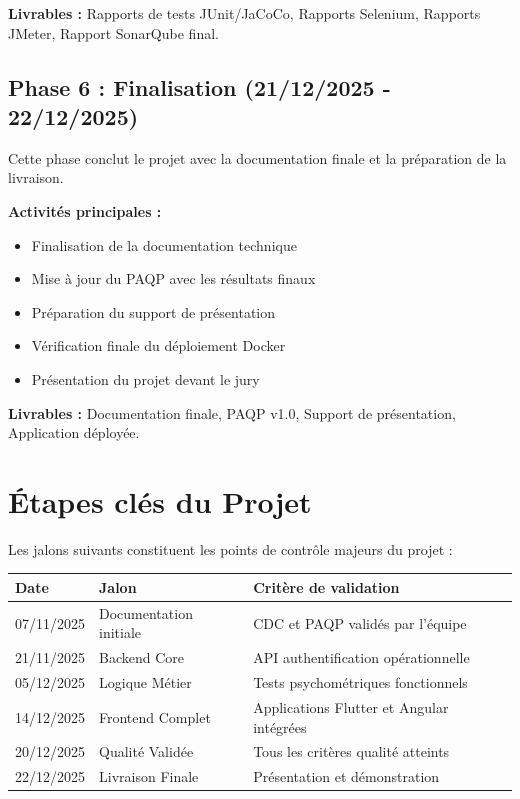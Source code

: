 \documentclass[12pt,a4paper]{report}
\begin{document}
\textbf{Livrables :} Rapports de tests JUnit/JaCoCo, Rapports Selenium, Rapports JMeter, Rapport SonarQube final.

\subsection{Phase 6 : Finalisation (21/12/2025 - 22/12/2025)}

Cette phase conclut le projet avec la documentation finale et la préparation de la livraison.

\textbf{Activités principales :}
\begin{itemize}
    \item Finalisation de la documentation technique
    \item Mise à jour du PAQP avec les résultats finaux
    \item Préparation du support de présentation
    \item Vérification finale du déploiement Docker
    \item Présentation du projet devant le jury
\end{itemize}

\textbf{Livrables :} Documentation finale, PAQP v1.0, Support de présentation, Application déployée.

\section{Étapes clés du Projet}

Les jalons suivants constituent les points de contrôle majeurs du projet :

\begin{center}
\begin{tabular}{|l|l|l|}
    \hline
    \textbf{Date} & \textbf{Jalon} & \textbf{Critère de validation} \\
    \hline
    07/11/2025 & Documentation initiale & CDC et PAQP validés par l'équipe \\
    \hline
    21/11/2025 & Backend Core & API authentification opérationnelle \\
    \hline
    05/12/2025 & Logique Métier & Tests psychométriques fonctionnels \\
    \hline
    14/12/2025 & Frontend Complet & Applications Flutter et Angular intégrées \\
    \hline
    20/12/2025 & Qualité Validée & Tous les critères qualité atteints \\
    \hline
    22/12/2025 & Livraison Finale & Présentation et démonstration \\
    \hline
\end{tabular}
\end{center}
\end{document}
